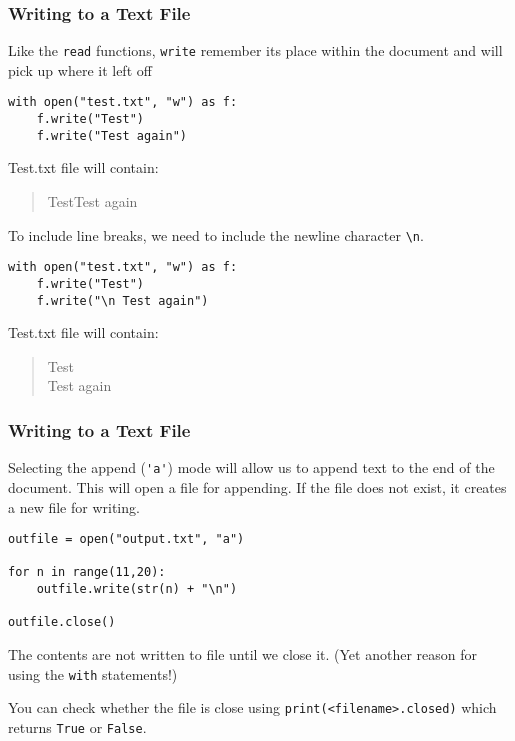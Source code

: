 \documentclass[xcolor=svgnames]{beamer}
\newcommand{\ft}[1]{\frametitle{#1}}
\begin{document}
\begin{frame}[fragile]\ft{Writing to a Text File}
Like the {\tt read} functions, {\tt write} remember its place within the document and will pick up where it left off
\begin{Verbatim}[xleftmargin=.5in, frame=single]
with open("test.txt", "w") as f:
	f.write("Test")
	f.write("Test again")
\end{Verbatim}
Test.txt file will contain:
\begin{quote}
TestTest again
\end{quote}
To include line breaks, we need to include the newline character \verb|\n|.
\begin{Verbatim}[xleftmargin=.5in, frame=single]
with open("test.txt", "w") as f:
    f.write("Test")
    f.write("\n Test again")
\end{Verbatim}
Test.txt file will contain:
\begin{quote}
Test\\
Test again
\end{quote}
\end{frame}



\begin{frame}[fragile]\ft{Writing to a Text File}
Selecting the append (\verb|'a'|) mode will allow us to append text to the end of the document. This will open a file for appending.  If the file does not exist, it creates a new file for writing. 
\begin{Verbatim}[xleftmargin=.5in, frame=single]
outfile = open("output.txt", "a")

for n in range(11,20):
    outfile.write(str(n) + "\n")

outfile.close() 
\end{Verbatim}
\begin{alertblock}{}
The contents are not written to file until we close it. (Yet another reason for using the {\tt with} statements!)
\end{alertblock}
\begin{block}{}
You can check whether the file is close using {\tt print(<filename>.closed)} which returns  {\tt True} or {\tt False}.
\end{block}

\end{frame}
\end{document}
